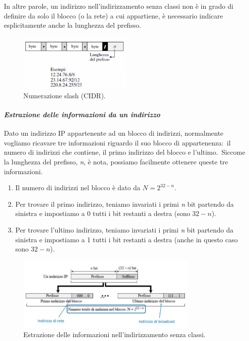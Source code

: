 In altre parole, un indirizzo nell'indirizzamento senza classi non è in grado di definire da solo il blocco (o la rete) a cui appartiene, è necessario indicare esplicitamente anche la lunghezza del prefisso.

\begin{figure}[H]
    \centering
    \includegraphics[width = 0.5\textwidth]{immagini/Notazione_slash.jpg}
    \caption*{Numerazione slash (CIDR).}
\end{figure}

\paragraph{\emph{Estrazione delle informazioni da un indirizzo}}
Dato un indirizzo IP appartenente ad un blocco di indirizzi, normalmente vogliamo ricavare tre informazioni riguardo il suo blocco di appartenenza:\ il numero di indirizzi che contiene, il primo indirizzo del blocco e l'ultimo.\
Siccome la lunghezza del prefisso, \emph{n}, è nota, possiamo facilmente ottenere queste tre informazioni.

\begin{enumerate}
    \item Il numero di indirizzi nel blocco è dato da $N = 2^{32-n}$.
    \item Per trovare il primo indirizzo, teniamo invariati i primi \emph{n} bit partendo da sinistra e impostiamo a 0 tutti i bit restanti a destra (sono $32-n$).
    \item Per trovare l'ultimo indirizzo, teniamo invariati i primi \emph{n} bit partendo da sinistra e impostiamo a 1 tutti i bit restanti a destra (anche in questo caso sono $32-n$).
\end{enumerate}

\begin{figure}[H]
    \centering
    \includegraphics[width = 0.8\textwidth]{immagini/Classless_addressing.jpg}
    \caption*{Estrazione delle informazioni nell'indirizzamento senza classi.}
\end{figure}

